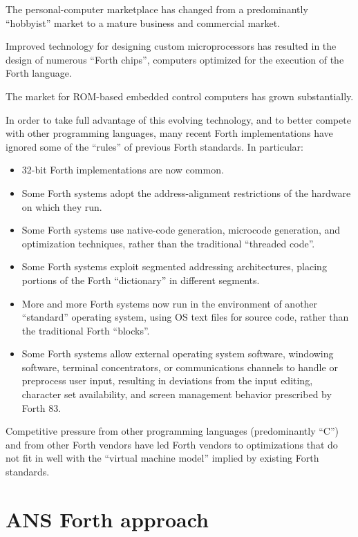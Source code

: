 The personal-computer marketplace has changed from a predominantly
``hobbyist'' market to a mature business and commercial market.

Improved technology for designing custom microprocessors has resulted
in the design of numerous ``Forth chips'', computers optimized for
the execution of the Forth language.

The market for ROM-based embedded control computers has grown
substantially.

In order to take full advantage of this evolving technology, and to
better compete with other programming languages, many recent Forth
implementations have ignored some of the ``rules'' of previous Forth
standards. In particular:

\begin{itemize}
\item 32-bit Forth implementations are now common.
\item Some Forth systems adopt the address-alignment restrictions of
	the hardware on which they run.
\item Some Forth systems use native-code generation, microcode
	generation, and optimization techniques, rather than the
	traditional ``threaded code''.
\item Some Forth systems exploit segmented addressing architectures,
	placing portions of the Forth ``dictionary'' in different segments.
\item More and more Forth systems now run in the environment of another
	``standard'' operating system, using OS text files for source code,
	rather than the traditional Forth ``blocks''.
\item Some Forth systems allow external operating system software,
	windowing software, terminal concentrators, or communications
	channels to handle or preprocess user input, resulting in deviations
	from the input editing, character set availability, and screen
	management behavior prescribed by Forth 83.
\end{itemize}

Competitive pressure from other programming languages (predominantly
``C'') and from other Forth vendors have led Forth vendors to
optimizations that do not fit in well with the ``virtual machine
model'' implied by existing Forth standards.


\section{ANS Forth approach} %

